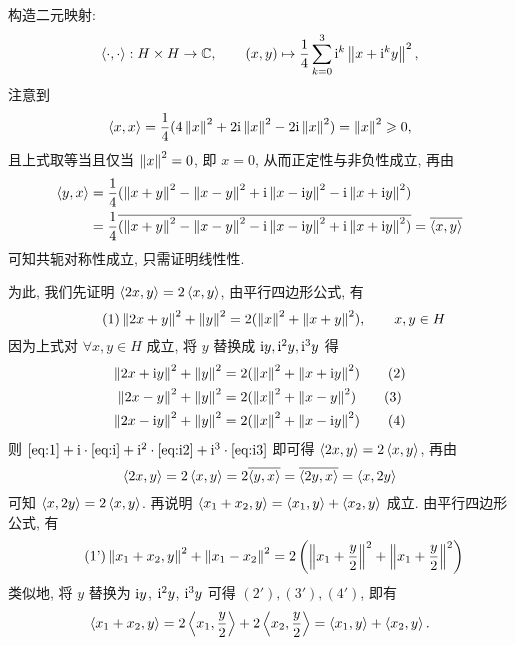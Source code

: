     \begin{Proof}
        构造二元映射:
        \[
            \left\langle \cdot, \cdot \right\rangle: H\times H\to \mathbb{C}, \qquad(x, y)\mapsto\frac{1}{4}\sum_{k=0}^3\mathrm{i}^k\left\| x+\mathrm{i}^ky \right\|^2,
        \]
        注意到
        \[
            \left\langle x, x \right\rangle=\frac{1}{4}(4\left\| x \right\|^{2}+2\mathrm{i}\left\| x \right\|^{2}-2\mathrm{i}\left\| x \right\|^{2})=\left\| x \right\|^{2}\geqslant0,
        \]
        且上式取等当且仅当 $ \left\| x \right\|^{2}=0 $, 即 $ x=0 $, 从而正定性与非负性成立, 再由
        \[
            \begin{aligned}
                \left\langle y, x \right\rangle & =\frac{1}{4}(\left\| x+y \right\|^{2}-\left\| x-y \right\|^{2}+\mathrm{i}\left\| x-\mathrm{i} y \right\|^{2}-\mathrm{i}\left\| x+\mathrm{i} y \right\|^{2})\\
                & = \frac{1}{4}\overline{(\left\| x+y \right\|^{2}-\left\| x-y \right\|^{2}-\mathrm{i}\left\| x-\mathrm{i} y \right\|^{2}+\mathrm{i}\left\| x+\mathrm{i} y \right\|^{2})} =\overline{\left\langle x, y \right\rangle}
            \end{aligned}
        \]
        可知共轭对称性成立, 只需证明线性性.

        为此, 我们先证明 $ \left\langle 2x, y \right\rangle=2\left\langle x, y \right\rangle $, 由平行四边形公式, 有
        \begin{equation}\tag{1}
            \left\| 2x+y \right\|^{2}+\left\| y \right\|^{2}=2(\left\| x \right\|^{2}+\left\| x+y \right\|^{2}),\qquad x, y\in H\label{eq:1}
        \end{equation}
        因为上式对 $ \forall x, y\in H $ 成立, 将 $ y $ 替换成 $ \mathrm{i} y, \mathrm{i}^{2} y, \mathrm{i}^{3} y $ 得
        \begin{align}
            \left\| 2x+\mathrm{i} y \right\|^{2}+\left\| y \right\|^{2}& =2(\left\| x \right\|^{2}+\left\| x+\mathrm{i} y \right\|^{2})\tag{2}\label{eq:i}\\
            \left\| 2x-y \right\|^{2}+\left\| y \right\|^{2} & =2(\left\| x \right\|^{2}+\left\| x-y \right\|^{2})\tag{3}\label{eq:i2}\\
            \left\| 2x-\mathrm{i} y \right\|^{2}+\left\| y \right\|^{2} & =2(\left\| x \right\|^{2}+\left\| x-\mathrm{i} y \right\|^{2})\label{eq:i3}\tag{4}
        \end{align}
        则 $ \eqref{eq:1}+\mathrm{i}\cdot\eqref{eq:i}+\mathrm{i}^{2}\cdot\eqref{eq:i2}+\mathrm{i}^{3}\cdot\eqref{eq:i3} $ 即可得 $ \left\langle 2x, y \right\rangle=2\left\langle x, y \right\rangle $, 再由
        \[
            \left\langle 2x, y \right\rangle=2\left\langle x, y \right\rangle=2\overline{\left\langle y, x \right\rangle}=\overline{\left\langle 2y, x \right\rangle}=\left\langle x, 2y \right\rangle
        \]
        可知 $ \left\langle x, 2y \right\rangle=2\left\langle x, y \right\rangle $. 再说明 $ \left\langle x_{1}+x_{2}, y \right\rangle=\left\langle x_{1}, y \right\rangle+\left\langle x_{2}, y \right\rangle $ 成立. 由平行四边形公式, 有
        \begin{equation}\tag{1'}
            \left\| x_{1}+x_{2}, y \right\|^{2}+\left\| x_{1}-x_{2} \right\|^{2}=2\left( \left\| x_{1}+\frac{y}{2} \right\|^{2}+\left\| x_{1}+\frac{y}{2} \right\|^{2} \right)
        \end{equation}
        类似地, 将 $ y $ 替换为 $ \mathrm{i} y $, $ \mathrm{i}^{2}y $, $ \mathrm{i}^{3}y $ 可得 $ (2'), (3'), (4') $, 即有
        \[
            \left\langle x_{1}+x_{2}, y \right\rangle=2\left\langle x_{1}, \frac{y}{2} \right\rangle+2\left\langle x_{2}, \frac{y}{2} \right\rangle=\left\langle x_{1}, y \right\rangle+\left\langle x_{2}, y \right\rangle.
        \]


\end{Proof}
